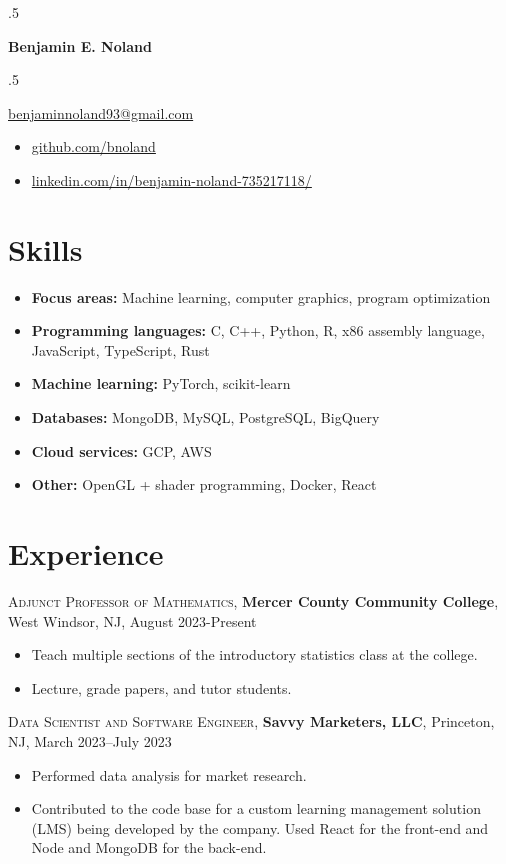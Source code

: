 \documentclass[letterpaper,10pt]{article}
\begin{document}
\begin{multicols}{2}
  \moveleft.5\hoffset\centerline{\Large\bf Benjamin E. Noland}
  \smallskip
  \moveleft.5\hoffset\centerline{\href{mailto:benjaminnoland93@gmail.com}{benjaminnoland93@gmail.com}}
  \columnbreak
  \begin{itemize}[label={}]
    \item \href{https://www.github.com/bnoland}{github.com/bnoland}
    \item \href{https://www.linkedin.com/in/benjamin-noland-735217118/}{linkedin.com/in/benjamin-noland-735217118/}
  \end{itemize}
\end{multicols}

\section*{Skills}

\begin{itemize}
  \item \textbf{Focus areas:} Machine learning, computer graphics, program optimization
  \item \textbf{Programming languages:} C, C++, Python, R, x86 assembly language, JavaScript, TypeScript, Rust
  \item \textbf{Machine learning:} PyTorch, scikit-learn
  \item \textbf{Databases:} MongoDB, MySQL, PostgreSQL, BigQuery
  \item \textbf{Cloud services:} GCP, AWS
  \item \textbf{Other:} OpenGL + shader programming, Docker, React
\end{itemize}

\section*{Experience}

\textsc{Adjunct Professor of Mathematics}, \textbf{Mercer County Community College}, West Windsor, NJ, August
2023-Present
\begin{itemize}
  \item Teach multiple sections of the introductory statistics class at the college.
  \item Lecture, grade papers, and tutor students.
\end{itemize}

\textsc{Data Scientist and Software Engineer}, \textbf{Savvy Marketers, LLC}, Princeton, NJ, March 2023--July 2023
\begin{itemize}
  \item Performed data analysis for market research.
  \item Contributed to the code base for a custom learning management solution (LMS) being developed by the company.
        Used React for the front-end and Node and MongoDB for the back-end.
\end{itemize}
\end{document}
